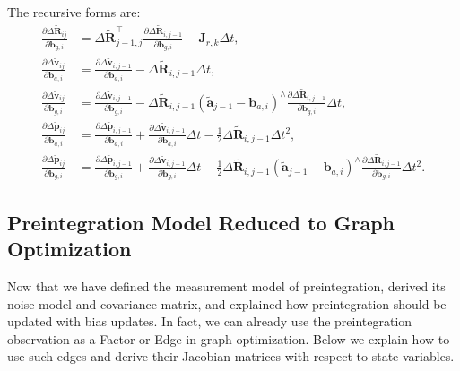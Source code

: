 The recursive forms are:
\begin{subequations}\label{eq:preinteg-jacob-bias-inc}
	\begin{align}
		\frac{\partial \Delta \tilde{\bm{R}}_{ij}}{\partial \bm{b}_{g,i}} &= \Delta \tilde{\bm{R}}_{j-1, 
			j}^\top \frac{\partial \Delta \tilde{\bm{R}}_{i,j-1}}{\partial \bm{b}_{g,i}} - \bm{J}_{r,k} \Delta 
		t, \\
		\frac{\partial \Delta \tilde{\bm{v}}_{ij}}{\partial \bm{b}_{a,i}} &= \frac{\partial \Delta 
			\tilde{\bm{v}}_{i, j-1}}{\partial \bm{b}_{a,i}} - \Delta \tilde{\bm{R}}_{i, j-1} \Delta t, \\ 
		\frac{\partial \Delta \tilde{\bm{v}}_{ij}}{\partial \bm{b}_{g,i}} &= \frac{\partial \Delta 
			\tilde{\bm{v}}_{i, j-1}}{\partial \bm{b}_{g,i}} - \Delta \tilde{\bm{R}}_{i, j-1} \left( \tilde{\bm{a}}_{j-1} 
		- \bm{b}_{a,i} \right)^\wedge \frac{\partial \Delta \tilde{\bm{R}}_{i,j-1}}{\partial \bm{b}_{g,i}} 
		\Delta t, \\
		\frac{\partial \Delta \tilde{\bm{p}}_{ij}}{\partial \bm{b}_{a,i}} &= \frac{\partial \Delta 
			\tilde{\bm{p}}_{i,j-1}}{\partial \bm{b}_{a,i}} + \frac{\partial \Delta \tilde{\bm{v}}_{i,j-1}}{\partial 
			\bm{b}_{a,i}}  \Delta t- \frac{1}{2} \Delta \tilde{\bm{R}}_{i, j-1} \Delta t^2, \\
		\frac{\partial \Delta \tilde{\bm{p}}_{ij}}{\partial \bm{b}_{g,i}} &= \frac{\partial \Delta 
			\tilde{\bm{p}}_{i,j-1}}{\partial \bm{b}_{g,i}} + \frac{\partial \Delta \tilde{\bm{v}}_{i,j-1}}{\partial 
			\bm{b}_{g,i}} \Delta t -\frac{1}{2} \Delta \tilde{\bm{R}}_{i, 
			j-1}\left(\tilde{\bm{a}}_{j-1}-\bm{b}_{a,i}\right)^\wedge  \frac{\partial \Delta 
			\tilde{\bm{R}}_{i,j-1}}{\partial \bm{b}_{g,i}} \Delta t^2. 
	\end{align}
\end{subequations}

\subsection{Preintegration Model Reduced to Graph Optimization}
\label{subsec:4.1.5}
Now that we have defined the measurement model of preintegration, derived its noise model and covariance matrix, and explained how preintegration should be updated with bias updates. In fact, we can already use the preintegration observation as a Factor or Edge in graph optimization. Below we explain how to use such edges and derive their Jacobian matrices with respect to state variables.

